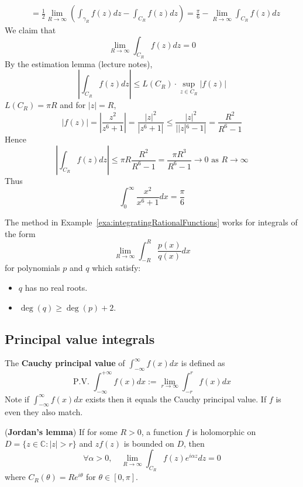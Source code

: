 \begin{example}
\[\begin{aligned}
			& = \frac{1}{2} \lim_{R \to \infty} \left( \int_{\gamma_R} f(z) dz - \int_{C_R} f(z) dz \right) = \frac{\pi}{6} - \lim_{R \to \infty} \int_{C_R} f(z) dz
		\end{aligned}
	\]
	We claim that
	\[
		\lim_{R \to \infty} \int_{C_R} f(z) dz = 0
	\]
	By the estimation lemma (lecture notes),
	\[
		\left| \int_{C_R} f(z) dz \right| \le L(C_R) \cdot \sup_{z \in C_R} |f(z)|
	\]
	$L(C_R) = \pi R$ and for $|z| = R$,
	\[
		|f(z)| = \left| \frac{z^2}{z^6 + 1} \right| = \frac{|z|^2}{|z^6 + 1|} \le \frac{|z|^2}{||z|^6 - 1|} = \frac{R^2}{R^6 - 1}
	\]
	Hence
	\[
		\left| \int_{C_R} f(z) dz \right| \le \pi R \frac{R^2}{R^6 - 1} = \frac{\pi R^3}{R^6 - 1} \to 0 \text{ as } R \to \infty
	\]
	Thus
	\[
		\int_{0}^{\infty} \frac{x^2}{x^6 + 1} dx = \frac{\pi}{6}
	\]
\end{example}

\begin{remark}
	The method in Example~\ref{exa:integratingRationalFunctions} works for integrals of the form
	\[
		\lim_{R \to \infty} \int_{-R}^{R} \frac{p(x)}{q(x)} dx
	\]
	for polynomials $p$ and $q$ which satisfy:
	\begin{itemize}
		\item $q$ has no real roots.
		\item $\deg(q) \ge \deg(p) + 2$.
	\end{itemize}
\end{remark}

\subsection{Principal value integrals}

\begin{definition}
	The \textbf{Cauchy principal value} of $\int_{-\infty}^{\infty} f(x) dx$ is defined as
	\[
		\text{P.V. } \int_{-\infty}^{+\infty} f(x) dx := \lim_{r \to \infty} \int_{-r}^{r} f(x) dx
	\]
	Note if $\int_{-\infty}^{\infty} f(x) dx$ exists then it equals the Cauchy principal value. If $f$ is even they also match.
\end{definition}

\begin{lemma}\label{lem:jordansLemma}
	(\textbf{Jordan's lemma}) If for some $R > 0$, a function $f$ is holomorphic on $D = \{ z \in \mathbb{C}: |z| > r \}$ and $z f(z)$ is bounded on $D$, then
	\[
		\forall \alpha > 0, \quad \lim_{R \to \infty} \int_{C_R} f(z) e^{i \alpha z} dz = 0
	\]
	where $C_R(\theta) = R e^{i \theta}$ for $\theta \in [0, \pi]$.
\end{lemma}

